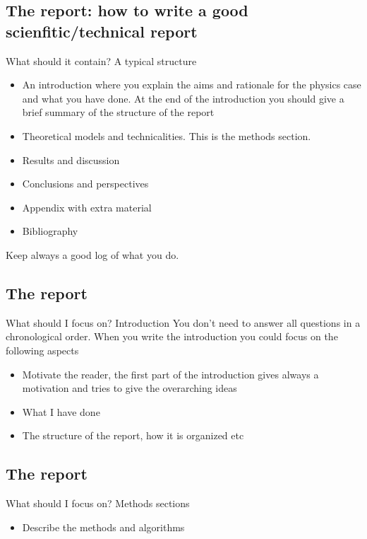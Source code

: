 \documentclass[%
oneside,                 %
final,                   %
10pt]{article}
\begin{document}
{{{{{{{{{%
\subsection{The report: how to write a good scienfitic/technical report}
\begin{block}{What should it contain? A typical structure }
\begin{itemize}
 \item An introduction where you explain the aims and rationale for the physics case and  what you have done. At the end of the introduction you should give a brief summary of the structure of the report

 \item Theoretical models and technicalities. This is the methods section.

 \item Results and discussion

 \item Conclusions and perspectives

 \item Appendix with extra material

 \item Bibliography
\end{itemize}

\noindent
Keep always a good log of what you do.
\end{block}

\subsection{The report}
\begin{block}{What should I focus on? Introduction }
You don't need to answer all questions in a chronological order.  When you write the introduction you could focus on the following aspects
\begin{itemize}
 \item Motivate the reader, the first part of the introduction gives always a motivation and tries to give the overarching ideas

 \item What I have done

 \item The structure of the report, how it is organized etc
\end{itemize}

\noindent
\end{block}


\subsection{The report}
\begin{block}{What should I focus on? Methods sections }
\begin{itemize}
 \item Describe the methods and algorithms


\end{itemize}
\end{block}}}}}}}}}}
\end{document}
